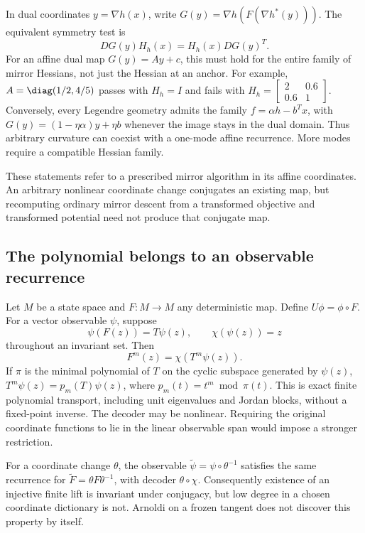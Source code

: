 In dual coordinates $y=\nabla h(x)$, write
$G(y)=\nabla h(F(\nabla h^*(y)))$. The equivalent symmetry test is
\begin{equation}
 DG(y)H_h(x)=H_h(x)DG(y)^T.
 \label{eq:dual-compatibility}
\end{equation}
For an affine dual map $G(y)=Ay+c$, this must hold for the entire family
of mirror Hessians, not just the Hessian at an anchor. For example,
$A=\diag(1/2,4/5)$ passes with $H_h=I$ and fails with
$H_h=\left[\begin{smallmatrix}2&0.6\\0.6&1\end{smallmatrix}\right]$.
Conversely, every Legendre geometry admits the family
$f=\alpha h-b^Tx$, with $G(y)=(1-\eta\alpha)y+\eta b$ whenever the image
stays in the dual domain. Thus arbitrary curvature can coexist with a
one-mode affine recurrence. More modes require a compatible Hessian family.

These statements refer to a prescribed mirror algorithm in its affine
coordinates. An arbitrary nonlinear coordinate change conjugates an existing
map, but recomputing ordinary mirror descent from a transformed objective
and transformed potential need not produce that conjugate map.

\subsection{The polynomial belongs to an observable recurrence}
Let $M$ be a state space and $F:M\to M$ any deterministic map. Define
$U\phi=\phi\circ F$. For a vector observable $\psi$, suppose
\begin{equation}
 \psi(F(z))=T\psi(z),\qquad \chi(\psi(z))=z
 \label{eq:general-lift}
\end{equation}
throughout an invariant set. Then
\begin{equation}
 F^m(z)=\chi(T^m\psi(z)).
 \label{eq:general-transport}
\end{equation}
If $\pi$ is the minimal polynomial of $T$ on the cyclic subspace generated
by $\psi(z)$, $T^m\psi(z)=p_m(T)\psi(z)$, where
$p_m(t)=t^m\bmod\pi(t)$. This is exact finite polynomial transport, including
unit eigenvalues and Jordan blocks, without a fixed-point inverse.
The decoder may be nonlinear. Requiring the original coordinate functions
to lie in the linear observable span would impose a stronger restriction.

For a coordinate change $\theta$, the observable
$\widetilde\psi=\psi\circ\theta^{-1}$ satisfies the same recurrence for
$\widetilde F=\theta F\theta^{-1}$, with decoder $\theta\circ\chi$.
Consequently existence of an injective finite lift is invariant under
conjugacy, but low degree in a chosen coordinate dictionary is not. Arnoldi
on a frozen tangent does not discover this property by itself.

